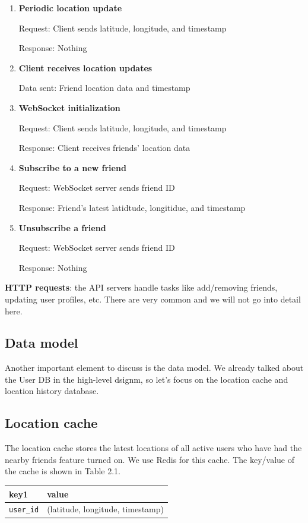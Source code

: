 \documentclass{report}
\theoremstyle{definition}
\let\oldsubsection\subsection
\renewcommand{\subsection}{\oldsubsection*}
\begin{document}
\begin{enumerate}
\item
\textbf{Periodic location update}

Request: Client sends latitude, longitude, and timestamp

Response: Nothing

\item
\textbf{Client receives location updates}

Data sent: Friend location data and timestamp

\item
\textbf{WebSocket initialization}

Request: Client sends latitude, longitude, and timestamp

Response: Client receives friends' location data
\item
\textbf{Subscribe to a new friend}

Request: WebSocket server sends friend ID

Response: Friend's latest latidtude, longitidue, and timestamp
\item
\textbf{Unsubscribe a friend}

Request: WebSocket server sends friend ID

Response: Nothing
\end{enumerate}

\textbf{HTTP requests}: the API servers handle tasks like add/removing friends, updating user profiles, etc. There are very common and we will not go into detail here.

\subsection{Data model}

Another important element to discuss is the data model. We already talked about the User DB in the high-level dsignm, so let's focus on the location cache and location history database.

\subsection{Location cache}

The location cache stores the latest locations of all active users who have had the nearby friends feature turned on. We use Redis for
this cache. The key/value of the cache is shown in Table 2.1.

\begin{tabular}{|p{6cm}|p{6cm}|}
\hline
key1 & value \\
\hline
\lstinline|user_id| & (latitude, longitude, timestamp) \\
\hline
\end{tabular}
\end{document}
